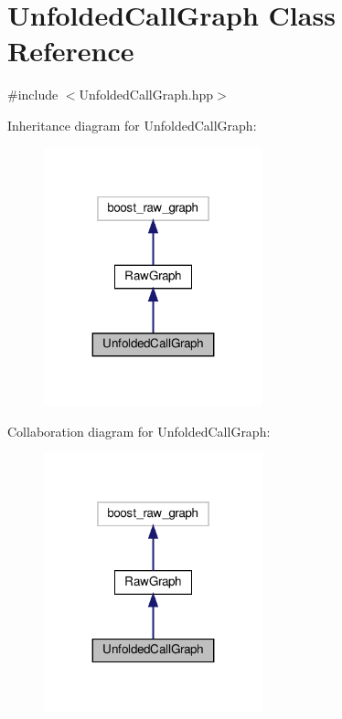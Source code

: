 \hypertarget{classUnfoldedCallGraph}{}\section{Unfolded\+Call\+Graph Class Reference}
\label{classUnfoldedCallGraph}


{\ttfamily \#include $<$Unfolded\+Call\+Graph.\+hpp$>$}



Inheritance diagram for Unfolded\+Call\+Graph\+:
\nopagebreak
\begin{figure}[H]
\begin{center}
\leavevmode
\includegraphics[width=179pt]{dd/d6f/classUnfoldedCallGraph__inherit__graph}
\end{center}
\end{figure}


Collaboration diagram for Unfolded\+Call\+Graph\+:
\nopagebreak
\begin{figure}[H]
\begin{center}
\leavevmode
\includegraphics[width=179pt]{d3/d2c/classUnfoldedCallGraph__coll__graph}
\end{center}
\end{figure}
